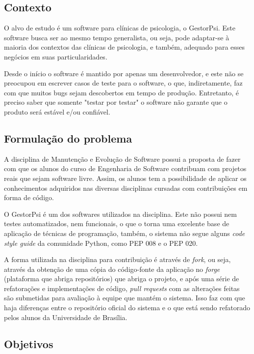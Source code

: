 
\subsection{Contexto} %
\label{sub:contexto}
O alvo de estudo é um software para clínicas de psicologia, o GestorPsi.
Este software busca ser ao mesmo tempo generalista, ou seja,
pode adaptar-se à maioria dos contextos das clínicas de psicologia, e também,
adequado para esses negócios em suas particularidades.

Desde o início o software é mantido por apenas um desenvolvedor,
e este não se preocupou em escrever casos de teste para o software, o que,
indiretamente, faz com que muitos bugs sejam descobertos em tempo de produção.
Entretanto, é preciso saber que somente "testar por testar" o software não garante
que o produto será estável e/ou confiável.
\subsection{Formulação do problema} %
\label{sub:formula_o_do_problema}

A disciplina de Manutenção e Evolução de Software possui a proposta de fazer com
que os alunos do curso de Engenharia de Software contribuam com projetos reais
que sejam software livre.
Assim, os alunos tem a possibilidade de aplicar os conhecimentos adquiridos nas
diversas disciplinas cursadas com contribuições em forma de código.

O GestorPsi é um dos softwares utilizados na disciplina. Este não possui nem testes
automatizados, nem funcionais, o que o torna uma excelente base de aplicação de
técnicas de programação, também, o sistema não segue alguns \textit{code style guide}
da comunidade Python, como PEP 008 e o PEP 020.

A forma utilizada na disciplina para contribuição é através de \textit{fork}, ou seja,
através da obtenção de uma cópia do código-fonte da aplicação no \textit{forge}
(plataforma que abriga repositórios) que abriga o projeto, e após uma série de
refatorações e implementações de código, \textit{pull requests} com as alterações
feitas são submetidas para avaliação à equipe que mantém o sistema. Isso faz com
que haja diferenças entre o repositório oficial do sistema e o que está sendo
refatorado pelos alunos da Universidade de Brasília.

\subsection{Objetivos} %
\label{sub:objetivos}
